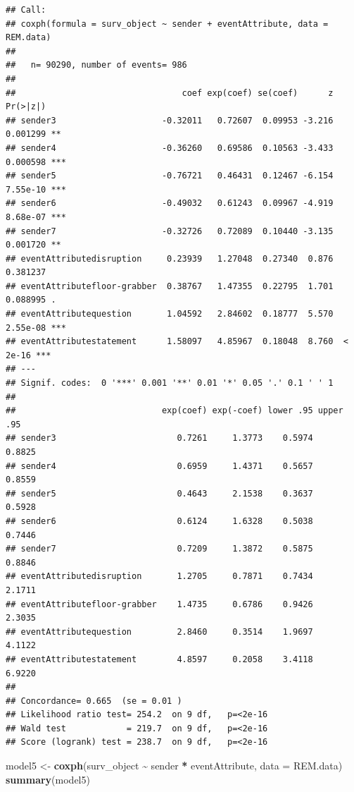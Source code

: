 \documentclass[
]{article}
\newenvironment{Shaded}{\begin{snugshade}}{\end{snugshade}}
\newcommand{\AttributeTok}[1]{\textcolor[rgb]{0.13,0.29,0.53}{#1}}
\newcommand{\FunctionTok}[1]{\textcolor[rgb]{0.13,0.29,0.53}{\textbf{#1}}}
\newcommand{\NormalTok}[1]{#1}
\newcommand{\OtherTok}[1]{\textcolor[rgb]{0.56,0.35,0.01}{#1}}
\newcommand{\SpecialCharTok}[1]{\textcolor[rgb]{0.81,0.36,0.00}{\textbf{#1}}}
\begin{document}
\begin{verbatim}
## Call:
## coxph(formula = surv_object ~ sender + eventAttribute, data = REM.data)
## 
##   n= 90290, number of events= 986 
## 
##                                 coef exp(coef) se(coef)      z Pr(>|z|)    
## sender3                     -0.32011   0.72607  0.09953 -3.216 0.001299 ** 
## sender4                     -0.36260   0.69586  0.10563 -3.433 0.000598 ***
## sender5                     -0.76721   0.46431  0.12467 -6.154 7.55e-10 ***
## sender6                     -0.49032   0.61243  0.09967 -4.919 8.68e-07 ***
## sender7                     -0.32726   0.72089  0.10440 -3.135 0.001720 ** 
## eventAttributedisruption     0.23939   1.27048  0.27340  0.876 0.381237    
## eventAttributefloor-grabber  0.38767   1.47355  0.22795  1.701 0.088995 .  
## eventAttributequestion       1.04592   2.84602  0.18777  5.570 2.55e-08 ***
## eventAttributestatement      1.58097   4.85967  0.18048  8.760  < 2e-16 ***
## ---
## Signif. codes:  0 '***' 0.001 '**' 0.01 '*' 0.05 '.' 0.1 ' ' 1
## 
##                             exp(coef) exp(-coef) lower .95 upper .95
## sender3                        0.7261     1.3773    0.5974    0.8825
## sender4                        0.6959     1.4371    0.5657    0.8559
## sender5                        0.4643     2.1538    0.3637    0.5928
## sender6                        0.6124     1.6328    0.5038    0.7446
## sender7                        0.7209     1.3872    0.5875    0.8846
## eventAttributedisruption       1.2705     0.7871    0.7434    2.1711
## eventAttributefloor-grabber    1.4735     0.6786    0.9426    2.3035
## eventAttributequestion         2.8460     0.3514    1.9697    4.1122
## eventAttributestatement        4.8597     0.2058    3.4118    6.9220
## 
## Concordance= 0.665  (se = 0.01 )
## Likelihood ratio test= 254.2  on 9 df,   p=<2e-16
## Wald test            = 219.7  on 9 df,   p=<2e-16
## Score (logrank) test = 238.7  on 9 df,   p=<2e-16
\end{verbatim}

\begin{Shaded}
\begin{Highlighting}[]
\NormalTok{model5 }\OtherTok{\textless{}{-}} \FunctionTok{coxph}\NormalTok{(surv\_object }\SpecialCharTok{\textasciitilde{}}\NormalTok{ sender }\SpecialCharTok{*}\NormalTok{ eventAttribute, }\AttributeTok{data =}\NormalTok{ REM.data)}
\FunctionTok{summary}\NormalTok{(model5)}
\end{Highlighting}
\end{Shaded}
\end{document}
